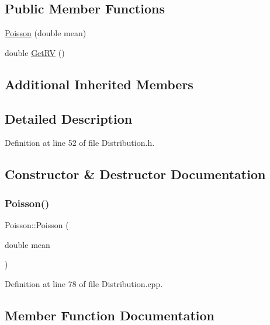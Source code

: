 \subsection*{Public Member Functions}
\begin{DoxyCompactItemize}
\item 
\hyperlink{class_poisson_a80feebeda47cc8afc67d7c20a4af748e}{Poisson} (double mean)
\item 
double \hyperlink{class_poisson_a068964aa05df4051b23a84d71529fb69}{Get\+RV} ()
\end{DoxyCompactItemize}
\subsection*{Additional Inherited Members}


\subsection{Detailed Description}


Definition at line 52 of file Distribution.\+h.



\subsection{Constructor \& Destructor Documentation}
\mbox{\label{class_poisson_a80feebeda47cc8afc67d7c20a4af748e}} 
\subsubsection{\texorpdfstring{Poisson()}{Poisson()}}
{\footnotesize\ttfamily Poisson\+::\+Poisson (\begin{DoxyParamCaption}\item[{double}]{mean }\end{DoxyParamCaption})}



Definition at line 78 of file Distribution.\+cpp.



\subsection{Member Function Documentation}
\mbox{\label{class_poisson_a068964aa05df4051b23a84d71529fb69}} 
